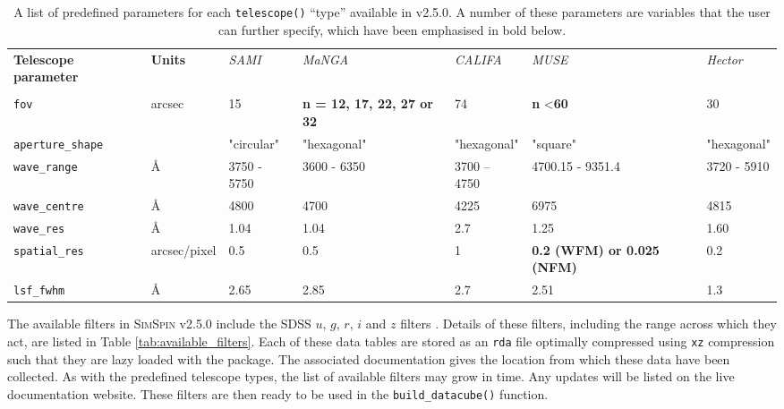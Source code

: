 \documentclass[
  journal=pasa,
  manuscript=research-paper, %
  year=2020,
  volume=37,
]{cup-journal}
\newcommand{\simspin}[1]{\textsc{SimSpin}#1} %
\newcommand{\ssversion}[1]{v2.5.0#1}
\newcommand{\telescope}[1]{\texttt{telescope()}#1}
\newcommand{\builddatacube}[1]{\texttt{build\_datacube()}#1}
\begin{document}
\begin{table}[ht!]
\caption{A list of predefined parameters for each \telescope{} ``type'' available in \ssversion. A number of these parameters are variables that the user can further specify, which have been emphasised in bold below.}
\label{tab:telescope_options}
\begin{tabular}{lllllll}
\hline
\textbf{Telescope parameter} & \textbf{Units} & \textit{SAMI} & \textit{MaNGA} & \textit{CALIFA} & \textit{MUSE} & \textit{Hector} \\
 &  & \citep{Croom2012SAMIOverview} & \citep{Bundy2015OverviewObservatory} &  &  &  \\ \hline
\texttt{fov} & arcsec & 15 & \textbf{n = 12, 17, 22, 27 or 32} & 74 & \textbf{n} \textless \textbf{60} & 30 \\
\texttt{aperture\_shape} &  & "circular" & "hexagonal" & "hexagonal" & "square" & "hexagonal" \\
\texttt{wave\_range} & \AA{} & 3750 - 5750 & 3600 - 6350 & 3700 – 4750 & 4700.15 - 9351.4 & 3720 - 5910 \\
\texttt{wave\_centre} & \AA{} & 4800 & 4700 & 4225 & 6975 & 4815 \\
\texttt{wave\_res} & \AA{} & 1.04 & 1.04 & 2.7 & 1.25 & 1.60 \\
\texttt{spatial\_res} & arcsec/pixel & 0.5 & 0.5 & 1 & \textbf{0.2 (WFM) or 0.025 (NFM)} & 0.2 \\
\texttt{lsf\_fwhm} & \AA{} & 2.65 & 2.85 & 2.7 & 2.51 & 1.3 \\ \hline
\end{tabular}
\end{table}

The available filters in \simspin{} \ssversion{} include the SDSS $u$, $g$, $r$, $i$ and $z$ filters \citep{Doi2010PhotometricImager}. 
Details of these filters, including the range across which they act, are listed in Table \ref{tab:available_filters}.
Each of these data tables are stored as an \texttt{rda} file optimally compressed using \texttt{xz} compression such that they are lazy loaded with the package. 
The associated documentation gives the location from which these data have been collected. 
As with the predefined telescope types, the list of available filters may grow in time.
Any updates will be listed on the live documentation website. 
These filters are then ready to be used in the \builddatacube{} function.
\end{document}
